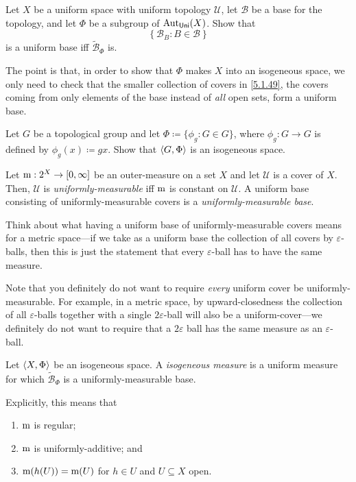 \begin{exr}\label{exr5.1.48}
Let $X$ be a uniform space with uniform topology $\mathcal{U}$, let $\mathcal{B}$ be a base for the topology, and let $\Phi$ be a subgroup of $\operatorname{Aut} _{\mathsf{Uni}}(X)$.  Show that
\begin{equation}\label{5.1.49}
\left\{ \mathcal{B}_B:B\in \mathcal{B}\right\}
\end{equation}
is a uniform base iff $\widetilde{\mathcal{B}}_\Phi$ is.
\begin{rmk}
The point is that, in order to show that $\Phi$ makes $X$ into an isogeneous space, we only need to check that the smaller collection of covers in \eqref{5.1.49}, the covers coming from only elements of the base instead of \emph{all} open sets, form a uniform base.
\end{rmk}
\end{exr}
\begin{exr}
Let $G$ be a topological group and let $\Phi \coloneqq \{ \phi _g:G\in G\}$, where $\phi _g:G\rightarrow G$ is defined by $\phi _g(x)\coloneqq gx$.  Show that $\langle G,\Phi\rangle$ is an isogeneous space.
\end{exr}
\begin{dfn}\label{UniformlyMeasurable}
Let $\mathrm{m} :2^X\rightarrow [0,\infty ]$ be an outer-measure on a set $X$ and let $\mathcal{U}$ is a cover of $X$.  Then, $\mathcal{U}$ is \emph{uniformly-measurable} iff $\mathrm{m}$ is constant on $\mathcal{U}$.  A uniform base consisting of uniformly-measurable covers is a \emph{uniformly-measurable base}.
\begin{rmk}
Think about what having a uniform base of uniformly-measurable covers means for a metric space---if we take as a uniform base the collection of all covers by $\varepsilon$-balls, then this is just the statement that every $\varepsilon$-ball has to have the same measure.
\end{rmk}
\begin{rmk}
Note that you definitely do not want to require \emph{every} uniform cover be uniformly-measurable.  For example, in a metric space, by upward-closedness the collection of all $\varepsilon$-balls together with a single $2\varepsilon$-ball will also be a uniform-cover---we definitely do not want to require that a $2\varepsilon$ ball has the same measure as an $\varepsilon$-ball.
\end{rmk}
\end{dfn}
\begin{dfn}
Let $\langle X,\Phi\rangle$ be an isogeneous space.  A \emph{isogeneous measure} is a uniform measure for which $\widetilde{\mathcal{B}}_\Phi$ is a uniformly-measurable base.
\begin{rmk}
Explicitly, this means that
\begin{enumerate}
\item $\mathrm{m}$ is regular;
\item $\mathrm{m}$ is uniformly-additive; and
\item $\mathrm{m} (h(U))=\mathrm{m} (U)$ for $h\in U$ and $U\subseteq X$ open.
\end{enumerate}
\end{rmk}
\end{dfn}
